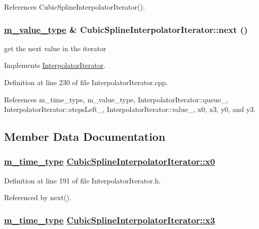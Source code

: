 References Cubic\-Spline\-Interpolator\-Iterator().\hypertarget{classCubicSplineInterpolatorIterator_a2}{
\subsubsection[next]{\setlength{\rightskip}{0pt plus 5cm}\hyperlink{Types_8h_a3}{m\_\-value\_\-type} \& Cubic\-Spline\-Interpolator\-Iterator::next ()}}
\label{classCubicSplineInterpolatorIterator_a2}


get the next value in the iterator 



Implements \hyperlink{classInterpolatorIterator_a4}{Interpolator\-Iterator}.

Definition at line 230 of file Interpolator\-Iterator.cpp.

References m\_\-time\_\-type, m\_\-value\_\-type, Interpolator\-Iterator::queue\_\-, Interpolator\-Iterator::steps\-Left\_\-, Interpolator\-Iterator::value\_\-, x0, x3, y0, and y3.

\subsection{Member Data Documentation}
\hypertarget{classCubicSplineInterpolatorIterator_r0}{
\subsubsection[x0]{\setlength{\rightskip}{0pt plus 5cm}\hyperlink{Types_8h_a2}{m\_\-time\_\-type} \hyperlink{classCubicSplineInterpolatorIterator_r0}{Cubic\-Spline\-Interpolator\-Iterator::x0}}}
\label{classCubicSplineInterpolatorIterator_r0}




Definition at line 191 of file Interpolator\-Iterator.h.

Referenced by next().\hypertarget{classCubicSplineInterpolatorIterator_r2}{
\subsubsection[x3]{\setlength{\rightskip}{0pt plus 5cm}\hyperlink{Types_8h_a2}{m\_\-time\_\-type} \hyperlink{classCubicSplineInterpolatorIterator_r2}{Cubic\-Spline\-Interpolator\-Iterator::x3}}}
\label{classCubicSplineInterpolatorIterator_r2}




